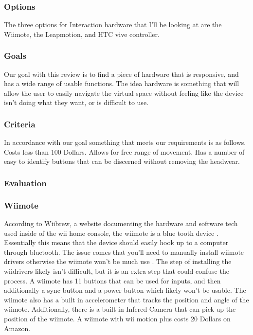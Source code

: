 \subsubsection{Options}
The three options for Interaction hardware that I'll be looking at are the Wiimote, the Leapmotion, and HTC vive controller.

\subsubsection{Goals}
Our goal with this review is to find a piece of hardware that is responsive, and has a wide range of usable functions. The idea hardware is something that will allow the user to easily navigate the virtual space without feeling like the device isn't doing what they want, or is difficult to use.

\subsubsection{Criteria}
In accordance with our goal something that meets our requirements is as follows.
Costs less than 100 Dollars.
Allows for free range of movement.
Has a number of easy to identify buttons that can be discerned without removing the headwear.

\subsubsection{Evaluation}
\subsubsection{Wiimote}
According to Wiibrew, a website documenting the hardware and software tech used inside of the wii home console, the wiimote is a blue tooth device .
Essentially this means that the device should easily hook up to a computer through bluetooth.
The issue comes that you'll need to manually install wiimote drivers otherwise the wiimote won't be much use .
The step of installing the wiidrivers likely isn't difficult, but it is an extra step that could confuse the process.
A wiimote has 11 buttons that can be used for inputs, and then additionally a sync button and a power button which likely won't be usable.
The wiimote also has a built in accelerometer that tracks the position and angle of the wiimote.
Additionally, there is a built in Infered Camera that can pick up the position of the wiimote.
A wiimote with wii motion plus costs 20 Dollars on Amazon.

